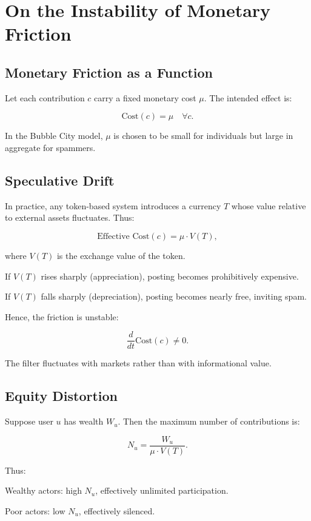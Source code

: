 \documentclass{book}
\begin{document}
\appendix
\chapter{On the Instability of Monetary Friction}

\section{Monetary Friction as a Function}

Let each contribution \( c \) carry a fixed monetary cost \( \mu \). The intended effect is:

\[ \text{Cost}(c) = \mu \quad \forall c. \]

In the Bubble City model, \( \mu \) is chosen to be small for individuals but large in aggregate for spammers.

\section{Speculative Drift}

In practice, any token-based system introduces a currency \( T \) whose value relative to external assets fluctuates. Thus:

\[ \text{Effective Cost}(c) = \mu \cdot V(T), \]

where \( V(T) \) is the exchange value of the token.

If \( V(T) \) rises sharply (appreciation), posting becomes prohibitively expensive.

If \( V(T) \) falls sharply (depreciation), posting becomes nearly free, inviting spam.

Hence, the friction is unstable:

\[ \frac{d}{dt} \text{Cost}(c) \neq 0. \]

The filter fluctuates with markets rather than with informational value.

\section{Equity Distortion}

Suppose user \( u \) has wealth \( W_u \). Then the maximum number of contributions is:

\[ N_u = \frac{W_u}{\mu \cdot V(T)}. \]

Thus:

Wealthy actors: high \( N_u \), effectively unlimited participation.

Poor actors: low \( N_u \), effectively silenced.
\end{document}
